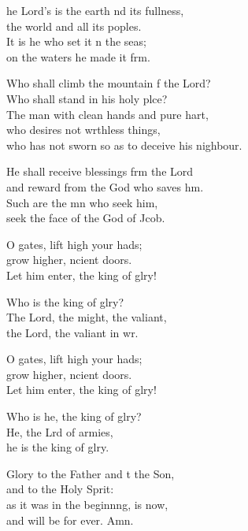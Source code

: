 \begin{psalmverse}
  \begin{patverse}
    he Lord’s is the earth nd its fullness,\Med\\
    the world and all its poples.\\
It is he who set it n the seas;\Med\\
    on the waters he made it f\pointup{\i}rm.

Who shall climb the mountain f the Lord?\Med\\
    Who shall stand in his holy plce?\\
The man with clean hands and pure hart,\Flex\\
    who desires not wrthless things,\Med\\
    who has not sworn so as to deceive his nighbour.

He shall receive blessings frm the Lord\Med\\
    and reward from the God who saves h\pointup{\i}m.\\
Such are the mn who seek him,\Med\\
    seek the face of the God of Jcob.

O gates, lift high your hads;\Flex\\
    grow higher, ncient doors.\Med\\
    Let him enter, the king of glry!

Who is the king of glry?\Flex\\
    The Lord, the might, the valiant,\Med\\
    the Lord, the valiant in wr.

O gates, lift high your hads;\Flex\\
    grow higher, ncient doors.\Med\\
    Let him enter, the king of glry!

Who is he, the king of glry?\Flex\\
    He, the Lrd of armies,\Med\\
    he is the king of glry.

Glory to the Father and t the Son,\Med\\
    and to the Holy Sp\pointup{\i}rit:\\
as it was in the beginn\pointup{\i}ng, is now,\Med\\
    and will be for ever. Amn.
  \end{patverse}
\end{psalmverse}
